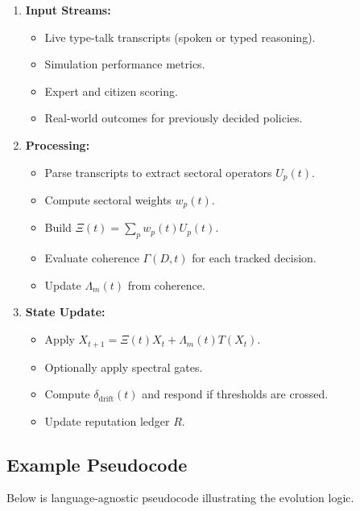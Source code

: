 \documentclass[11pt]{article}
\begin{document}
\begin{enumerate}[leftmargin=1.5em]
    \item \textbf{Input Streams:}
    \begin{itemize}
        \item Live type-talk transcripts (spoken or typed reasoning).
        \item Simulation performance metrics.
        \item Expert and citizen scoring.
        \item Real-world outcomes for previously decided policies.
    \end{itemize}
    \item \textbf{Processing:}
    \begin{itemize}
        \item Parse transcripts to extract sectoral operators \(U_p(t)\).
        \item Compute sectoral weights \(w_p(t)\).
        \item Build \(\Xi(t) = \sum_p w_p(t) U_p(t)\).
        \item Evaluate coherence \(\Gamma(D,t)\) for each tracked decision.
        \item Update \(\Lambda_m(t)\) from coherence.
    \end{itemize}
    \item \textbf{State Update:}
    \begin{itemize}
        \item Apply \(X_{t+1} = \Xi(t) X_t + \Lambda_m(t) T(X_t)\).
        \item Optionally apply spectral gates.
        \item Compute \(\delta_{\text{drift}}(t)\) and respond if thresholds are crossed.
        \item Update reputation ledger \(R\).
    \end{itemize}
\end{enumerate}

\subsection{Example Pseudocode}

Below is language-agnostic pseudocode illustrating the evolution logic.
\end{document}
